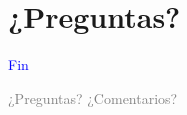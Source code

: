 \documentclass[
	11pt, %
]{beamer}
\begin{document}

\section{¿Preguntas?}

\begin{frame}[plain]
	\begin{center}
		{\Huge \textcolor{blue}{Fin}}

		\bigskip\bigskip

		{\LARGE \textcolor{gray}{¿Preguntas? ¿Comentarios?}}
	\end{center}
\end{frame}

\end{document}
